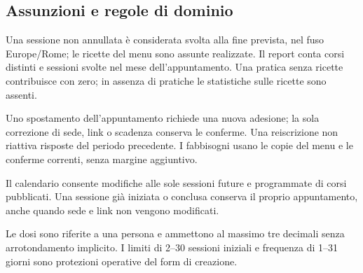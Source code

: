 \documentclass[11pt,a4paper]{article}
\begin{document}
\subsection{Assunzioni e regole di dominio}

Una sessione non annullata è considerata svolta alla fine prevista, nel fuso Europe/Rome; le ricette del menu sono assunte realizzate. Il report conta corsi distinti e sessioni svolte nel mese dell'appuntamento. Una pratica senza ricette contribuisce con zero; in assenza di pratiche le statistiche sulle ricette sono assenti.

Uno spostamento dell'appuntamento richiede una nuova adesione; la sola correzione di sede, link o scadenza conserva le conferme. Una reiscrizione non riattiva risposte del periodo precedente. I fabbisogni usano le copie del menu e le conferme correnti, senza margine aggiuntivo.

Il calendario consente modifiche alle sole sessioni future e programmate di corsi pubblicati. Una sessione già iniziata o conclusa conserva il proprio appuntamento, anche quando sede e link non vengono modificati.

Le dosi sono riferite a una persona e ammettono al massimo tre decimali senza arrotondamento implicito. I limiti di 2--30 sessioni iniziali e frequenza di 1--31 giorni sono protezioni operative del form di creazione.
\end{document}
